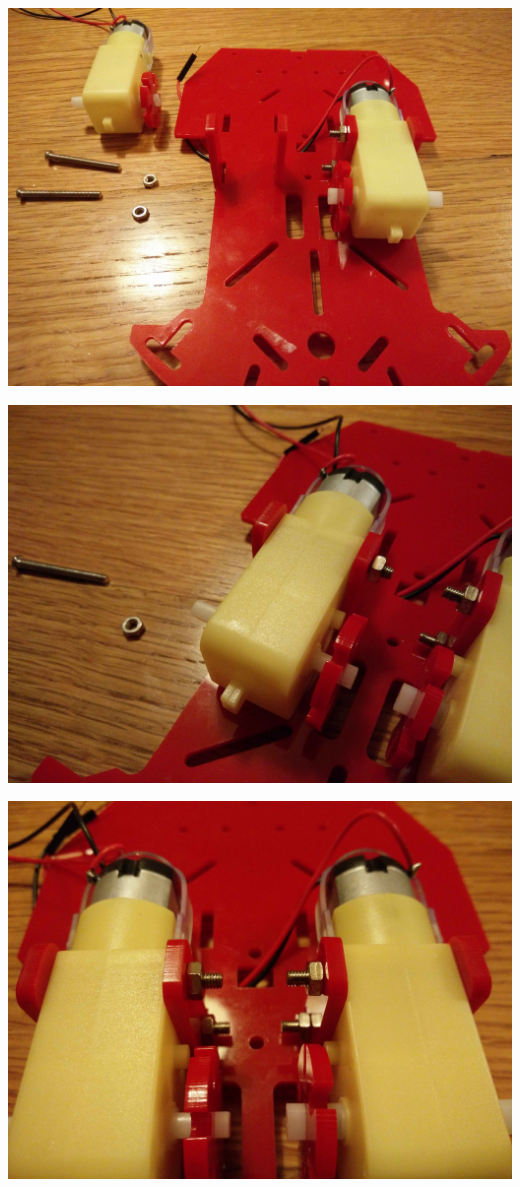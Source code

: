 \documentclass[]{bilingualworkshop}
\begin{document}
    \includegraphics[width=15cm]{img/4.jpg}\par
    \includegraphics[width=15cm]{img/5.jpg}\par
    \includegraphics[width=15cm]{img/6.jpg}\par
\end{document}
